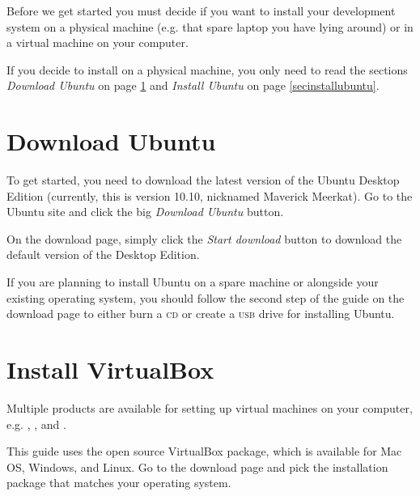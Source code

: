 \documentclass[draft,ebook,10pt,twoside,openright]{memoir}
\begin{document}
\noindent
Before we get started you must decide if you want to install your development system on a physical machine (e.g. that spare laptop you have lying around) or in a virtual machine on your computer.

If you decide to install on a physical machine, you only need to read the sections \emph{Download Ubuntu} on page \ref{secdownloadubuntu} and \emph{Install Ubuntu} on page \ref{secinstallubuntu}.

\section{Download Ubuntu} \label{secdownloadubuntu}

To get started, you need to download the latest version of the Ubuntu Desktop Edition (currently, this is version 10.10, nicknamed Maverick Meerkat). Go to the Ubuntu site and click the big \emph{Download Ubuntu} button.


On the download page, simply click the \emph{Start download} button to download the default version of the Desktop Edition.


If you are planning to install Ubuntu on a spare machine or alongside your existing operating system, you should follow the second step of the guide on the download page to either burn a \textsc{cd} or create a \textsc{usb} drive for installing Ubuntu.

\section{Install VirtualBox} \label{secinstallvirtualbox}

Multiple products are available for setting up virtual machines on your computer, e.g. , , and .

This guide uses the open source VirtualBox package, which is available for Mac OS, Windows, and Linux. Go to the download page and pick the installation package that matches your operating system.
\end{document}
